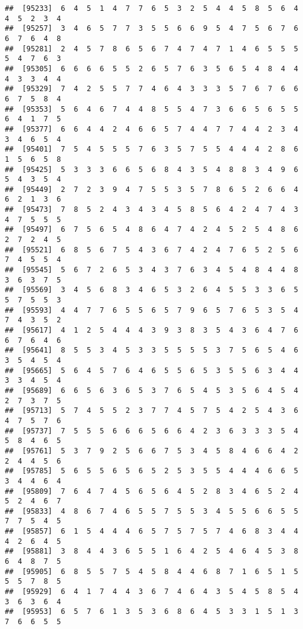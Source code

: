 \documentclass[
]{book}
\begin{document}
\begin{verbatim}
##  [95233]  6  4  5  1  4  7  7  6  5  3  2  5  4  4  5  8  5  6  4  4  5  2  3  4
##  [95257]  3  4  6  5  7  7  3  5  5  6  6  9  5  4  7  5  6  7  6  6  7  6  4  8
##  [95281]  2  4  5  7  8  6  5  6  7  4  7  4  7  1  4  6  5  5  5  5  4  7  6  3
##  [95305]  6  6  6  6  5  5  2  6  5  7  6  3  5  6  5  4  8  4  4  4  3  3  4  4
##  [95329]  7  4  2  5  5  7  7  4  6  4  3  3  3  5  7  6  7  6  6  6  7  5  8  4
##  [95353]  5  6  4  6  7  4  4  8  5  5  4  7  3  6  6  5  6  5  5  6  4  1  7  5
##  [95377]  6  6  4  4  2  4  6  6  5  7  4  4  7  7  4  4  2  3  4  3  4  6  5  4
##  [95401]  7  5  4  5  5  5  7  6  3  5  7  5  5  4  4  4  2  8  6  1  5  6  5  8
##  [95425]  5  3  3  3  6  6  5  6  8  4  3  5  4  8  8  3  4  9  6  5  4  3  5  4
##  [95449]  2  7  2  3  9  4  7  5  5  3  5  7  8  6  5  2  6  6  4  6  2  1  3  6
##  [95473]  7  8  5  2  4  3  4  3  4  5  8  5  6  4  2  4  7  4  3  4  7  5  5  5
##  [95497]  6  7  5  6  5  4  8  6  4  7  4  2  4  5  2  5  4  8  6  2  7  2  4  5
##  [95521]  6  8  5  6  7  5  4  3  6  7  4  2  4  7  6  5  2  5  6  7  4  5  5  4
##  [95545]  5  6  7  2  6  5  3  4  3  7  6  3  4  5  4  8  4  4  8  3  6  3  7  5
##  [95569]  3  4  5  6  8  3  4  6  5  3  2  6  4  5  5  3  3  6  5  5  7  5  5  3
##  [95593]  4  4  7  7  6  5  5  6  5  7  9  6  5  7  6  5  3  5  4  7  4  3  5  2
##  [95617]  4  1  2  5  4  4  4  3  9  3  8  3  5  4  3  6  4  7  6  6  7  6  4  6
##  [95641]  8  5  5  3  4  5  3  3  5  5  5  5  3  7  5  6  5  4  6  3  5  4  5  4
##  [95665]  5  6  4  5  7  6  4  6  5  5  6  5  3  5  5  6  3  4  4  3  3  4  5  4
##  [95689]  6  6  5  6  3  6  5  3  7  6  5  4  5  3  5  6  4  5  4  2  7  3  7  5
##  [95713]  5  7  4  5  5  2  3  7  7  4  5  7  5  4  2  5  4  3  6  4  7  5  7  6
##  [95737]  7  5  5  5  6  6  6  5  6  6  4  2  3  6  3  3  3  5  4  5  8  4  6  5
##  [95761]  5  3  7  9  2  5  6  6  7  5  3  4  5  8  4  6  6  4  2  2  4  4  5  6
##  [95785]  5  6  5  5  6  5  6  5  2  5  3  5  5  4  4  4  6  6  5  3  4  4  6  4
##  [95809]  7  6  4  7  4  5  6  5  6  4  5  2  8  3  4  6  5  2  4  5  2  4  6  7
##  [95833]  4  8  6  7  4  6  5  5  7  5  5  3  4  5  5  6  6  5  5  7  7  5  4  5
##  [95857]  6  1  5  4  4  4  6  5  7  5  7  5  7  4  6  8  3  4  4  4  2  6  4  5
##  [95881]  3  8  4  4  3  6  5  5  1  6  4  2  5  4  6  4  5  3  8  6  4  8  7  5
##  [95905]  6  8  5  5  7  5  4  5  8  4  4  6  8  7  1  6  5  1  5  5  5  7  8  5
##  [95929]  6  4  1  7  4  4  3  6  7  4  6  4  3  5  4  5  8  5  4  3  6  3  6  4
##  [95953]  6  5  7  6  1  3  5  3  6  8  6  4  5  3  3  1  5  1  3  7  6  6  5  5

\end{verbatim}
\end{document}
